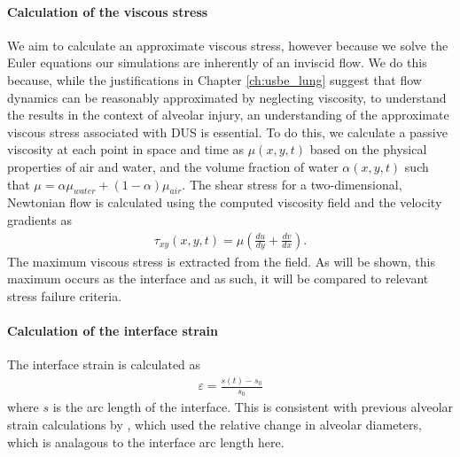\paragraph*{Calculation of the viscous stress}
We aim to calculate an approximate viscous stress, however because we
solve the Euler equations our simulations are inherently of an
inviscid flow. We do this because, while the justifications in Chapter
\ref{ch:usbe_lung} suggest that flow dynamics can be reasonably
approximated by neglecting viscosity, to understand the results in the
context of alveolar injury, an understanding of the approximate
viscous stress associated with \ac{DUS} is essential. To do this, we
calculate a passive viscosity at each point in space and time as
$\mu(x,y,t)$ based on the physical properties of air and water, and
the volume fraction of water $\alpha(x,y,t)$ such that
$\mu = \alpha\mu_{water} + (1-\alpha)\mu_{air}$. The shear stress for
a two-dimensional, Newtonian flow is calculated using the computed
viscosity field and the velocity gradients as
\begin{align}
  \tau_{xy}(x,y,t) = \mu\left(\frac{du}{dy}+ \frac{dv}{dx}\right).
\end{align}
The maximum viscous stress is extracted from the field. As will be
shown, this maximum occurs as the interface and as such, it will be
compared to relevant stress failure criteria.
%

%
\paragraph*{Calculation of the interface strain}
The interface strain is calculated as 
\begin{align}%
  \label{eq:linear_strain}%
  \varepsilon = \frac{s(t) - s_0}{s_0}
\end{align}
where $s$ is the arc length of the interface.  This is consistent with
previous alveolar strain calculations by \cite{Roan2011}, which used
the relative change in alveolar diameters, which is analagous to the
interface arc length here.


